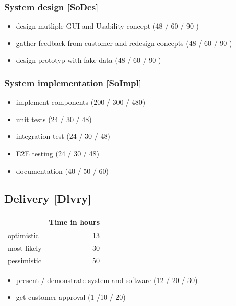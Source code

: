 \subsubsection{System design [SoDes]}
\label{sec:org1137d7c}
\begin{itemize}
\item design mutliple GUI and Usability concept (48 / 60 / 90 )
\item gather feedback from customer and redesign concepts (48 / 60 / 90 )
\item design prototyp with fake data (48 / 60 / 90 )
\end{itemize}
\subsubsection{System implementation [SoImpl]}
\label{sec:orgf2f809f}
\begin{itemize}
\item implement components (200 / 300 / 480)
\item unit tests (24 / 30 / 48)
\item integration test (24 / 30 / 48)
\item E2E testing (24 / 30 / 48)
\item documentation (40 / 50 / 60)
\end{itemize}



\subsection{Delivery [Dlvry]}
\label{sec:org1388080}
\begin{center}
\begin{tabular}{|l|r|}
	\hline
	& Time in hours\\
	\hline
	optimistic & 13\\
	\hline
	most likely & 30\\
	\hline
	pessimistic & 50\\
	\hline
\end{tabular}
\end{center}
\begin{itemize}
\item present / demonstrate system and software (12 / 20 / 30)
\item get customer approval (1 /10 / 20)
\end{itemize}


